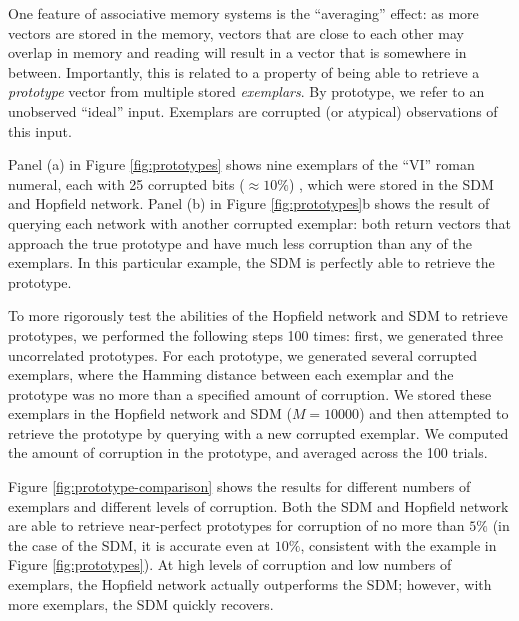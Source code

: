 \documentclass[10pt,letterpaper]{article}
\begin{document}
One feature of associative memory systems is the ``averaging'' effect:
as more vectors are stored in the memory, vectors that are close to
each other may overlap in memory and reading will result in a vector
that is somewhere in between. Importantly, this is related to a
property of being able to retrieve a \textit{prototype} vector from
multiple stored \textit{exemplars}. By prototype, we refer to an
unobserved ``ideal'' input. Exemplars are corrupted (or atypical)
observations of this input.

Panel (a) in Figure \ref{fig:prototypes} shows nine exemplars of the
``VI'' roman numeral, each with 25 corrupted bits ($\approx10\%$) ,
which were stored in the SDM and Hopfield network. Panel (b) in Figure
\ref{fig:prototypes}b shows the result of querying each network with
another corrupted exemplar: both return vectors that approach the true
prototype and have much less corruption than any of the exemplars. In
this particular example, the SDM is perfectly able to retrieve the
prototype.

To more rigorously test the abilities of the Hopfield network and SDM
to retrieve prototypes, we performed the following steps 100 times:
first, we generated three uncorrelated prototypes. For each prototype,
we generated several corrupted exemplars, where the Hamming distance
between each exemplar and the prototype was no more than a specified
amount of corruption. We stored these exemplars in the Hopfield
network and SDM ($M=10000$) and then attempted to retrieve the
prototype by querying with a new corrupted exemplar. We computed the
amount of corruption in the prototype, and averaged across the 100
trials. 

Figure \ref{fig:prototype-comparison} shows the results for different
numbers of exemplars and different levels of corruption. Both the SDM
and Hopfield network are able to retrieve near-perfect prototypes for
corruption of no more than $5\%$ (in the case of the SDM, it is
accurate even at $10\%$, consistent with the example in
Figure \ref{fig:prototypes}). At high levels of corruption and low
numbers of exemplars, the Hopfield network actually outperforms the
SDM; however, with more exemplars, the SDM quickly recovers.


\end{document}
